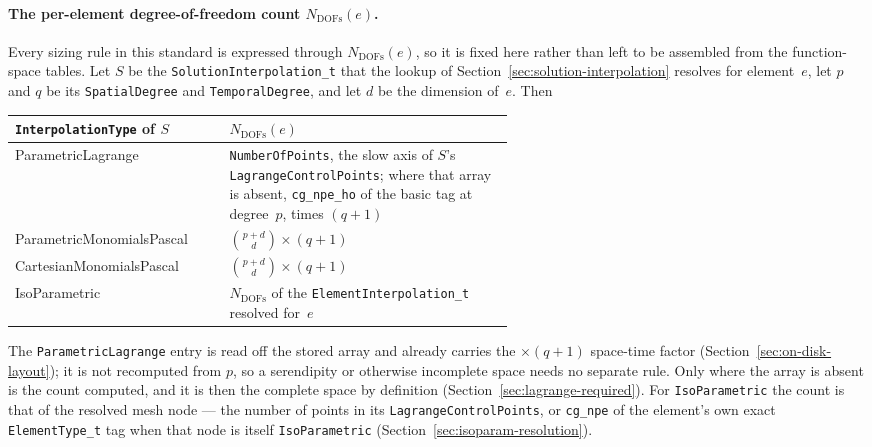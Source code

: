 \documentclass[11pt,letterpaper]{article}
\newif\ifvfourdraft
\newenvironment{v4block}{\ifvfourdraft\color{v4violet}\fi\ignorespaces}{\par}
\newcommand{\vfourmark}{\ifvfourdraft\textcolor{v4violet}{\textbf{[v4]}}\ \fi}
\begin{document}
\begin{v4block}
\paragraph{\vfourmark The per-element degree-of-freedom count $N_\mathrm{DOFs}(e)$.}
\label{sec:ndofs}
Every sizing rule in this standard is expressed through $N_\mathrm{DOFs}(e)$, so it
is fixed here rather than left to be assembled from the function-space tables.  Let
$S$ be the \texttt{SolutionInterpolation\_t} that the lookup of
Section~\ref{sec:solution-interpolation} resolves for element~$e$, let $p$ and $q$
be its \texttt{SpatialDegree} and \texttt{TemporalDegree}, and let $d$ be the
dimension of~$e$.  Then

\smallskip
\begin{tabular}{@{}>{\ttfamily}l >{\raggedright\arraybackslash}p{0.58\linewidth}@{}}
\toprule
\normalfont\textbf{\texttt{InterpolationType} of $S$} & \textbf{$N_\mathrm{DOFs}(e)$} \\
\midrule
ParametricLagrange        & \texttt{NumberOfPoints}, the slow axis of $S$'s
                            \texttt{LagrangeControlPoints}; where that array is
                            absent, \texttt{cg\_npe\_ho} of the basic tag at
                            degree~$p$, times $(q+1)$ \\
ParametricMonomialsPascal & $\binom{p+d}{d}\times(q+1)$ \\
CartesianMonomialsPascal  & $\binom{p+d}{d}\times(q+1)$ \\
IsoParametric             & $N_\mathrm{DOFs}$ of the \texttt{ElementInterpolation\_t}
                            resolved for~$e$ \\
\bottomrule
\end{tabular}

\smallskip
\noindent The \texttt{ParametricLagrange} entry is read off the stored array and
already carries the $\times(q+1)$ space-time factor
(Section~\ref{sec:on-disk-layout}); it is not recomputed from $p$, so a serendipity
or otherwise incomplete space needs no separate rule.  Only where the array is
absent is the count computed, and it is then the complete space by definition
(Section~\ref{sec:lagrange-required}).  For \texttt{IsoParametric}
the count is that of the resolved mesh node --- the number of points in its
\texttt{LagrangeControlPoints}, or \texttt{cg\_npe} of the element's own exact
\texttt{ElementType\_t} tag when that node is itself \texttt{IsoParametric}
(Section~\ref{sec:isoparam-resolution}).


\end{v4block}
\end{document}
